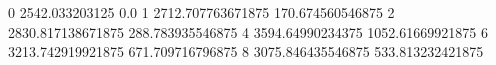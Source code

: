0 2542.033203125 0.0
1 2712.707763671875 170.674560546875
2 2830.817138671875 288.783935546875
4 3594.64990234375 1052.61669921875
6 3213.742919921875 671.709716796875
8 3075.846435546875 533.813232421875
